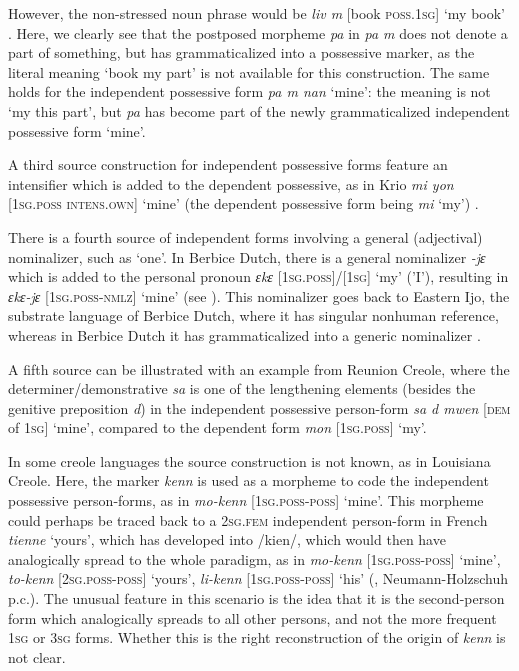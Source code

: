 \documentclass[output=paper]{langsci/langscibook}
\begin{document}
However, the non-stressed noun phrase would be \textit{liv m} [book \textsc{poss.1sg]} `my book' \citep{Fattier2013}. Here, we clearly see that the postposed morpheme \textit{pa} in \textit{pa m} does not denote a part of something, but has grammaticalized into a possessive marker, as the literal meaning `book my part' is not available for this construction. The same holds for the independent possessive form \textit{pa m nan} `mine': the meaning is not `my this part', but \textit{pa} has become part of the newly grammaticalized independent possessive form `mine'. 

A third source construction for independent possessive forms feature an intensifier which is added to the dependent possessive, as in Krio \textit{mi yon} [\textsc{1sg.poss} \textsc{intens.own}] `mine' (the dependent possessive form being \textit{mi} `my') \citep{Finney2013}.

There is a fourth source of independent forms involving a general (adjectival) nominalizer, such as `one'. In Berbice Dutch, there is a general nominalizer \textit{{}-jɛ} which is added to the personal pronoun \textit{ɛkɛ} [\textsc{1sg.poss}]/[1\textsc{sg}] `my' ('I'), resulting in \textit{ɛkɛ-jɛ} [\textsc{1sg.poss-nmlz}] `mine' (see ). This nominalizer goes back to Eastern Ijo, the substrate language of Berbice Dutch, where it has singular nonhuman reference, whereas in Berbice Dutch it has grammaticalized into a generic nominalizer \citep{Kouwenberg2013}.

A fifth source can be illustrated with an example from Reunion Creole, where the  determiner/demonstrative \textit{sa} is one of the lengthening elements (besides the genitive preposition \textit{d}) in the independent possessive person-form \textit{sa d mwen} [\textsc{dem} of \textsc{1sg}] `mine', compared to the dependent form \textit{mon} [\textsc{1sg.poss}] `my'.

In some creole languages the source construction is not known, as in Louisiana Creole. Here, the marker \textit{kenn} is used as a morpheme to code the independent possessive person-forms, as in \textit{mo-kenn} [\textsc{1sg.poss-poss}] `mine'. This morpheme could perhaps be traced back to a \textsc{2sg.fem} independent person-form in French \textit{tienne} `yours', which has developed into /kien/, which would then have analogically spread to the whole paradigm, as in \textit{mo-kenn} [\textsc{1sg.poss-poss}] `mine', \textit{to-kenn} [\textsc{2sg.poss-poss}] `yours', \textit{li-kenn} [\textsc{1sg.poss-poss}] `his' (\citealt{Neumann-HolzschuhKlingler2013}, Neumann-Holzschuh p.c.). The unusual feature in this scenario is the idea that it is the second-person form which analogically spreads to all other persons, and not the more frequent \textsc{1sg} or \textsc{3sg} forms. Whether this is the right reconstruction of the origin of \textit{kenn} is not clear.
\end{document}

